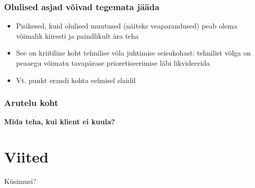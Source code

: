 \begin{frame}[fragile]
  \frametitle{Olulised asjad võivad tegemata jääda}
		\begin{itemize}
			\item Pisikesed, kuid olulised muutused (näiteks veaparandused) peab olema võimalik kiiresti ja paindlikult ära teha
			\item See on kriitiline koht tehnilise võla juhtimise seisukohast: tehnilist võlga on peaaegu võimatu tavapärase prioretiseerimise läbi likvideerida 
			\item Vt. punkt erandi kohta eelmisel slaidil
		\end{itemize}
\end{frame}


\begin{frame}[fragile]
  \frametitle{Arutelu koht}
		\begin{center}
			\textbf{Mida teha, kui klient ei kuula?}
		\end{center}
\end{frame}


\section{Viited}

\begin{frame}[t,allowframebreaks,]
  	
	 

\end{frame}

\begin{frame}[plain]
	\begin{center}Küsimusi?\end{center}
\end{frame}

